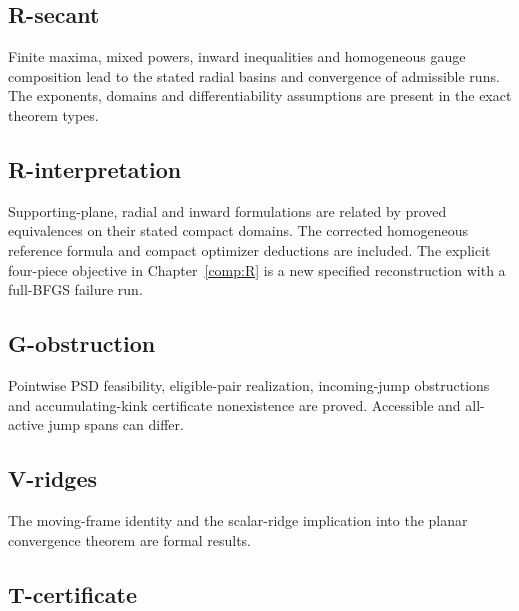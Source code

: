 \subsection{R-secant}\label{r-secant}

Finite maxima, mixed powers, inward inequalities and homogeneous gauge composition lead to the stated radial basins and convergence of admissible runs. The exponents, domains and differentiability assumptions are present in the exact theorem types.



\subsection{R-interpretation}\label{r-interpretation}

Supporting-plane, radial and inward formulations are related by proved equivalences on their stated compact domains. The corrected homogeneous reference formula and compact optimizer deductions are included. The explicit four-piece objective in Chapter~\ref{comp:R} is a new specified reconstruction with a full-BFGS failure run.



\subsection{G-obstruction}\label{g-obstruction}

Pointwise PSD feasibility, eligible-pair realization, incoming-jump obstructions and accumulating-kink certificate nonexistence are proved. Accessible and all-active jump spans can differ.



\subsection{V-ridges}\label{v-ridges}

The moving-frame identity and the scalar-ridge implication into the planar convergence theorem are formal results.



\subsection{T-certificate}\label{t-certificate}

